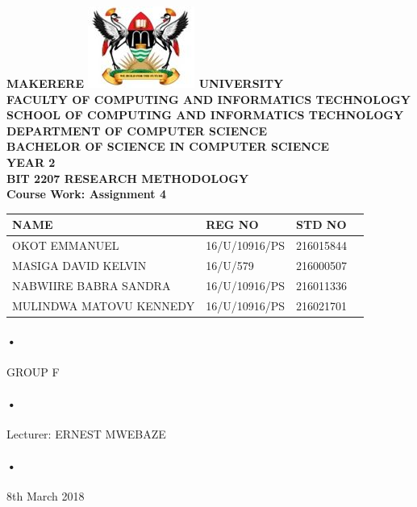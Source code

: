 \documentclass[12pt]{report}
\begin{document}
\begin{Huge}
\begin{center}
\begin{normalsize}
\textbf{MAKERERE \includegraphics[scale=0.5]{logo} UNIVERSITY }\\


\textbf{FACULTY OF COMPUTING AND INFORMATICS TECHNOLOGY} \\
\textbf{SCHOOL OF COMPUTING AND INFORMATICS TECHNOLOGY} \\
\textbf{DEPARTMENT OF COMPUTER SCIENCE} \\
\textbf{BACHELOR OF SCIENCE IN COMPUTER SCIENCE} \\
\textbf{YEAR 2} \\
\textbf{BIT 2207 RESEARCH METHODOLOGY} \\
\textbf{Course Work: Assignment 4}\\
\end{normalsize}
\end{center}
\end{Huge}

\begin{center}
\begin{tabular}{|l|l|l|c|}
\hline NAME  & REG NO & STD NO \\\hline
OKOT EMMANUEL& 16/U/10916/PS & 216015844 \\\hline
MASIGA DAVID KELVIN& 16/U/579 & 216000507 \\\hline
NABWIIRE BABRA SANDRA& 16/U/10916/PS & 216011336 \\\hline
MULINDWA MATOVU KENNEDY& 16/U/10916/PS & 216021701 \\\hline
\end{tabular}
\paragraph{•}
GROUP F\\
\paragraph{•}
Lecturer: ERNEST MWEBAZE \\
\paragraph{•}
8th March 2018

\end{center}
\end{document}
